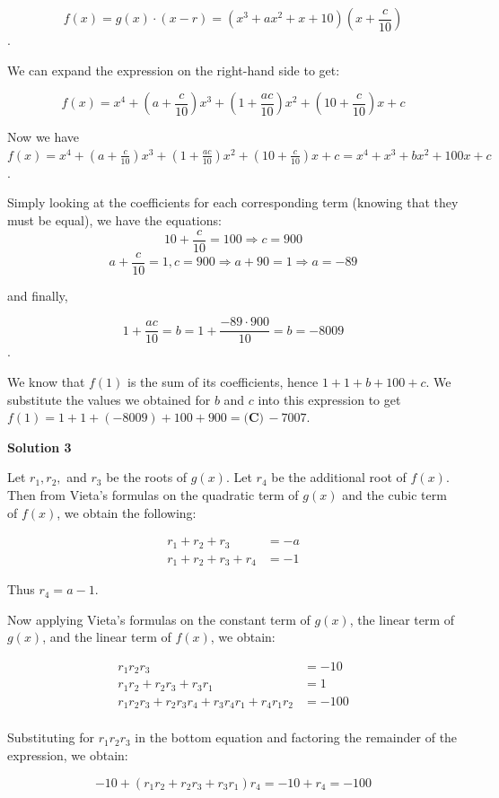 \begin{enumerate}
 
 \[f(x) = g(x)\cdot (x-r) = (x^3+ax^2+x+10)(x+\frac{c}{10})\].

 We can expand the expression on the right-hand side to get:

 
 \[f(x) = x^4+(a+\frac{c}{10})x^3+(1+\frac{ac}{10})x^2+(10+\frac{c}{10})x+c\]

 Now we have $f(x) = x^4+(a+\frac{c}{10})x^3+(1+\frac{ac}{10})x^2+(10+\frac{c}{10})x+c=x^4+x^3+bx^2+100x+c$.

 Simply looking at the coefficients for each corresponding term (knowing that they must be equal), we have the equations:
 \[10+\frac{c}{10}=100 \Rightarrow c=900\]
 \[a+\frac{c}{10} = 1, c=900 \Rightarrow a + 90 =1 \Rightarrow a= -89\]

 and finally,

 
 \[1+\frac{ac}{10} = b = 1+\frac{-89 \cdot 900}{10} = b = -8009\].

 We know that $f(1)$ is the sum of its coefficients, hence $1+1+b+100+c$. We substitute the values we obtained for $b$ and $c$ into this expression to get $f(1) = 1 + 1 + (-8009) + 100 + 900 = \boxed{\textbf{(C)}\,-7007}$.

 



\textbf{Solution 3}

Let $r_1,r_2,$ and $r_3$ be the roots of $g(x)$. Let $r_4$ be the additional root of $f(x)$. Then from Vieta's formulas on the quadratic term of $g(x)$ and the cubic term of $f(x)$, we obtain the following:

 
 \begin{align*} r_1+r_2+r_3&=-a \\  r_1+r_2+r_3+r_4&=-1 \end{align*}


 Thus $r_4=a-1$.

 Now applying Vieta's formulas on the constant term of $g(x)$, the linear term of $g(x)$, and the linear term of $f(x)$, we obtain:

 
 \begin{align*} r_1r_2r_3  & = -10\\ r_1r_2+r_2r_3+r_3r_1 &= 1\\  r_1r_2r_3+r_2r_3r_4+r_3r_4r_1+r_4r_1r_2  & = -100\\ \end{align*}


 Substituting for $r_1r_2r_3$ in the bottom equation and factoring the remainder of the expression, we obtain:

 
 \[-10+(r_1r_2+r_2r_3+r_3r_1)r_4=-10+r_4=-100\]


\end{enumerate}
